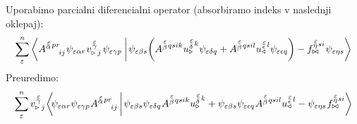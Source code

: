 Uporabimo parcialni diferencialni operator (absorbiramo indeks v naslednji oklepaj):
\begin{equation*}
   \sum^n_\varepsilon
   \braket{
      A^{\substack{\mkern2mu \varepsilon \\[-0.65mm] \alpha} \mkern2mu p r}_{\mkern29mu i j}
         \mkern1mu
      \psi_{ \varepsilon \alpha r}
         \mkern1mu
      v^{\mkern 2mu \substack{\varepsilon \\[-0.65mm] \gamma \\[-0.2mm]}}_{\triangleright \mkern5mu j} \mkern2mu
      \psi_{\varepsilon \gamma p} \mkern4mu}
   {
         \mkern2mu
      \psi_{\varepsilon \beta s} 
      \qty( A^{\substack{\mkern2mu \varepsilon \\[0.05mm] \beta} \mkern2mu q s i k} u^{\substack{\mkern2mu \varepsilon \\[0.10mm] \delta} \mkern2mu k}_\triangleright
      \psi_{\varepsilon \delta q}
      +
      A^{\substack{\mkern2mu \varepsilon \\[0.05mm] \beta} \mkern2mu q s i l}
      u^{\substack{\mkern2mu \varepsilon \\[-0.55mm] \epsilon} \mkern2mu l}_\triangleleft
      \psi_{\varepsilon \epsilon q} )
      -
      f^{\substack{\mkern2mu \varepsilon \\[-0.59mm] \eta} \mkern1mu s i}_{\bowtie} \mkern1mu
      \psi_{\varepsilon \eta s} }
\end{equation*}
Preuredimo:
\begin{equation*}
   \sum^n_\varepsilon
   v^{\mkern 2mu \substack{\varepsilon \\[-0.65mm] \gamma \\[-0.2mm]}}_{\triangleright \mkern5mu j} \mkern-2mu
   \braket{
      \mkern-4mu \psi_{ \varepsilon \alpha r}
      \psi_{\varepsilon \gamma p} \mkern1mu
      A^{\substack{\mkern2mu \varepsilon \\[-0.65mm] \alpha} \mkern2mu p r}_{\mkern29mu i j}  \mkern3mu }
   {
      \mkern2mu \psi_{\varepsilon \beta s}
      \psi_{\varepsilon \delta q} \mkern1mu
      A^{\substack{\mkern2mu \varepsilon \\[0.05mm] \beta} \mkern2mu q s i k}
      u^{\substack{\mkern2mu \varepsilon \\[0.09mm] \delta} \mkern2mu k}_\triangleright
      +
      \psi_{\varepsilon \beta s}
      \psi_{\varepsilon \epsilon q} \mkern1mu
      A^{\substack{\mkern2mu \varepsilon \\[0.05mm] \beta} \mkern2mu q s i l}
      u^{\substack{\mkern2mu \varepsilon \\[-0.55mm] \epsilon} \mkern2mu l}_\triangleleft
      -
      \psi_{\varepsilon \eta s} \mkern1mu
      f^{\substack{\mkern2mu \varepsilon \\[-0.59mm] \eta} \mkern1mu s i}_{\bowtie} }
\end{equation*}
